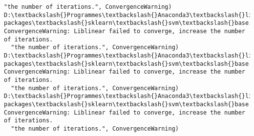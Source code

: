 \documentclass[11pt]{article}
\begin{document}
\begin{Verbatim}[commandchars=\\\{\}]
  "the number of iterations.", ConvergenceWarning)
D:\textbackslash{}Programmes\textbackslash{}Anaconda3\textbackslash{}lib\textbackslash{}site-packages\textbackslash{}sklearn\textbackslash{}svm\textbackslash{}base.py:922: ConvergenceWarning: Liblinear failed to converge, increase the number of iterations.
  "the number of iterations.", ConvergenceWarning)
D:\textbackslash{}Programmes\textbackslash{}Anaconda3\textbackslash{}lib\textbackslash{}site-packages\textbackslash{}sklearn\textbackslash{}svm\textbackslash{}base.py:922: ConvergenceWarning: Liblinear failed to converge, increase the number of iterations.
  "the number of iterations.", ConvergenceWarning)
D:\textbackslash{}Programmes\textbackslash{}Anaconda3\textbackslash{}lib\textbackslash{}site-packages\textbackslash{}sklearn\textbackslash{}svm\textbackslash{}base.py:922: ConvergenceWarning: Liblinear failed to converge, increase the number of iterations.
  "the number of iterations.", ConvergenceWarning)

    \end{Verbatim}
\end{document}
